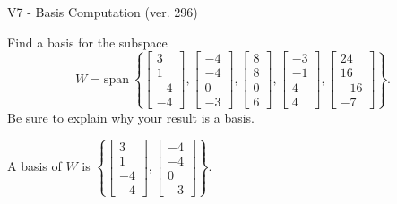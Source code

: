 \begin{exercise}
  \begin{exerciseTitle}V7 - Basis Computation (ver. 296)\end{exerciseTitle}
  \begin{exerciseStatement}
    Find a basis for the subspace 
\[W=\mathrm{span}\ \left\{\left[\begin{array}{r}
3 \\
1 \\
-4 \\
-4
\end{array}\right] , \left[\begin{array}{r}
-4 \\
-4 \\
0 \\
-3
\end{array}\right] , \left[\begin{array}{r}
8 \\
8 \\
0 \\
6
\end{array}\right] , \left[\begin{array}{r}
-3 \\
-1 \\
4 \\
4
\end{array}\right] , \left[\begin{array}{r}
24 \\
16 \\
-16 \\
-7
\end{array}\right]\right\}.\]
 Be sure to explain why your result is a basis.


  \end{exerciseStatement}
  \begin{exerciseAnswer}
   A basis of \(W\) is  \(\left\{\left[\begin{array}{r}
3 \\
1 \\
-4 \\
-4
\end{array}\right] , \left[\begin{array}{r}
-4 \\
-4 \\
0 \\
-3
\end{array}\right]\right\}\).
  


  \end{exerciseAnswer}
\end{exercise}